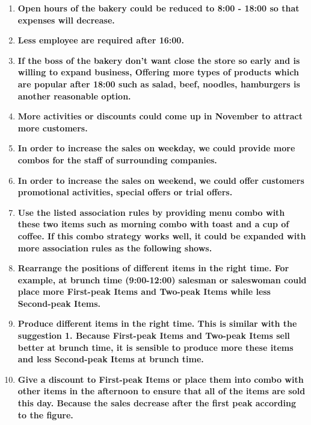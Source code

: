 \documentclass[11pt]{article}
\providecommand{\tightlist}{%
      \setlength{\itemsep}{0pt}\setlength{\parskip}{0pt}}
\begin{document}
\begin{enumerate}
\def\labelenumi{\arabic{enumi}.}
\tightlist
\item
  \textbf{Open hours of the bakery could be reduced to 8:00 - 18:00 so
  that expenses will decrease.}
\item
  \textbf{Less employee are required after 16:00.}
\item
  \textbf{If the boss of the bakery don't want close the store so early
  and is willing to expand business, Offering more types of products
  which are popular after 18:00 such as salad, beef, noodles, hamburgers
  is another reasonable option.}
\item
  \textbf{More activities or discounts could come up in November to
  attract more customers.}
\item
  \textbf{In order to increase the sales on weekday, we could provide
  more combos for the staff of surrounding companies.}
\item
  \textbf{In order to increase the sales on weekend, we could offer
  customers promotional activities, special offers or trial offers.}
\item
  \textbf{Use the listed association rules by providing menu combo with
  these two items such as morning combo with toast and a cup of coffee.
  If this combo strategy works well, it could be expanded with more
  association rules as the following shows.}
\item
  \textbf{Rearrange the positions of different items in the right time.
  For example, at brunch time (9:00-12:00) salesman or saleswoman could
  place more First-peak Items and Two-peak Items while less Second-peak
  Items.}
\item
  \textbf{Produce different items in the right time. This is similar
  with the suggestion 1. Because First-peak Items and Two-peak Items
  sell better at brunch time, it is sensible to produce more these items
  and less Second-peak Items at brunch time.}
\item
  \textbf{Give a discount to First-peak Items or place them into combo
  with other items in the afternoon to ensure that all of the items are
  sold this day. Because the sales decrease after the first peak
  according to the figure.}
\end{enumerate}


    
    
    
    
\end{document}

